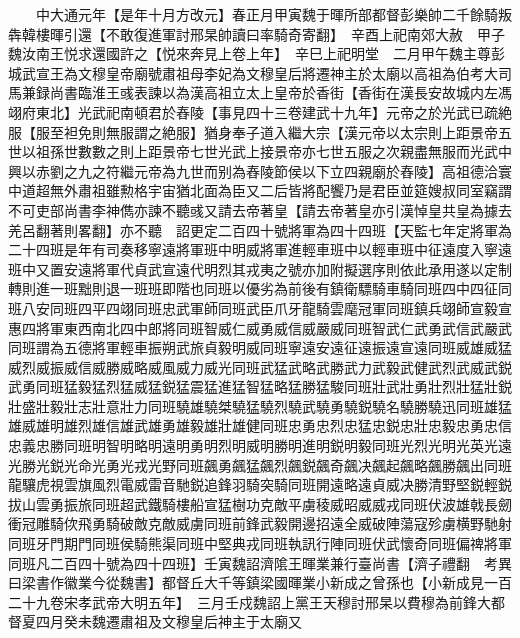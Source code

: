 　　中大通元年【是年十月方改元】春正月甲寅魏于暉所部都督彭樂帥二千餘騎叛犇韓樓暉引還【不敢復進軍討邢杲帥讀曰率騎奇寄翻】　辛酉上祀南郊大赦　甲子魏汝南王悦求還國許之【悦來奔見上卷上年】　辛巳上祀明堂　二月甲午魏主尊彭城武宣王為文穆皇帝廟號肅祖母李妃為文穆皇后將遷神主於太廟以高祖為伯考大司馬兼録尚書臨淮王彧表諫以為漢高祖立太上皇帝於香街【香街在漢長安故城内左馮翊府東北】光武祀南頓君於舂陵【事見四十三卷建武十九年】元帝之於光武已疏絶服【服至袒免則無服謂之絶服】猶身奉子道入繼大宗【漢元帝以太宗則上距景帝五世以祖孫世數數之則上距景帝七世光武上接景帝亦七世五服之次親盡無服而光武中興以赤劉之九之符繼元帝為九世而别為舂陵節侯以下立四親廟於舂陵】高祖德洽寰中道超無外肅祖雖勲格宇宙猶北面為臣又二后皆將配饗乃是君臣並筵嫂叔同室竊謂不可吏部尚書李神儁亦諫不聽彧又請去帝著皇【請去帝著皇亦引漢悼皇共皇為據去羌呂翻著則畧翻】亦不聽　詔更定二百四十號將軍為四十四班【天監七年定將軍為二十四班是年有司奏移寧遠將軍班中明威將軍進輕車班中以輕車班中征遠度入寧遠班中又置安遠將軍代貞武宣遠代明烈其戎夷之號亦加附擬選序則依此承用遂以定制轉則進一班黜則退一班班即階也同班以優劣為前後有鎮衛驃騎車騎同班四中四征同班八安同班四平四翊同班忠武軍師同班武臣爪牙龍騎雲麾冠軍同班鎮兵翊師宣毅宣惠四將軍東西南北四中郎將同班智威仁威勇威信威嚴威同班智武仁武勇武信武嚴武同班謂為五德將軍輕車振朔武旅貞毅明威同班寧遠安遠征遠振遠宣遠同班威雄威猛威烈威振威信威勝威略威風威力威光同班武猛武略武勝武力武毅武健武烈武威武鋭武勇同班猛毅猛烈猛威猛鋭猛震猛進猛智猛略猛勝猛駿同班壯武壯勇壯烈壯猛壯鋭壯盛壯毅壯志壯意壯力同班驍雄驍桀驍猛驍烈驍武驍勇驍鋭驍名驍勝驍迅同班雄猛雄威雄明雄烈雄信雄武雄勇雄毅雄壯雄健同班忠勇忠烈忠猛忠鋭忠壯忠毅忠勇忠信忠義忠勝同班明智明略明遠明勇明烈明威明勝明進明鋭明毅同班光烈光明光英光遠光勝光鋭光命光勇光戎光野同班飆勇飆猛飆烈飆鋭飆奇飆决飆起飆略飆勝飆出同班龍驤虎視雲旗風烈電威雷音馳鋭追鋒羽騎突騎同班開遠略遠貞威决勝清野堅鋭輕鋭拔山雲勇振旅同班超武鐵騎樓船宣猛樹功克敵平虜稜威昭威威戎同班伏波雄戟長劒衝冠雕騎佽飛勇騎破敵克敵威虜同班前鋒武毅開邊招遠全威破陣蕩寇殄虜横野馳射同班牙門期門同班侯騎熊渠同班中堅典戎同班執訊行陣同班伏武懷奇同班偏禆將軍同班凡二百四十號為四十四班】壬寅魏詔濟隂王暉業兼行臺尚書【濟子禮翻　考異曰梁書作徽業今從魏書】都督丘大千等鎮梁國暉業小新成之曾孫也【小新成見一百二十九卷宋孝武帝大明五年】　三月壬戍魏詔上黨王天穆討邢杲以費穆為前鋒大都督夏四月癸未魏遷肅祖及文穆皇后神主于太廟又

